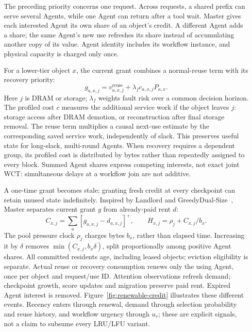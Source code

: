 The preceding priority concerns one request. Across requests, a shared
prefix can serve several Agents, while one Agent can return after a tool
wait. Master gives each interested Agent its own share of an object's
credit. A different Agent adds a share; the same Agent's new use refreshes
its share instead of accumulating another copy of its value. Agent
identity includes its workflow instance, and physical capacity is charged
only once.

For a lower-tier object $x$, the current grant combines a normal-reuse
term with its recovery priority:
\begin{equation}
 g_{a,x,j}=v^{\mathrm{reuse}}_{a,x,j}
                +\lambda_f c_{a,x,j}P_{a,x}.
 \label{eq:credit-grant}
\end{equation}
Here $j$ is DRAM or storage; $\lambda_f$ weights fault risk over a common
decision horizon. The profiled cost $c$ measures the additional service
work if the object leaves $j$: storage access after DRAM demotion, or
reconstruction after final storage removal. The reuse term multiplies a causal next-use estimate by the corresponding
saved service work, independently
of slack. This preserves useful state for long-slack, multi-round Agents.
When recovery requires a dependent group, its profiled cost is distributed
by bytes rather than repeatedly assigned to every block. Summed Agent
shares express competing interests, not exact joint WCT: simultaneous
delays at a workflow join are not additive.

A one-time grant becomes stale; granting fresh credit at every checkpoint
can retain unused state indefinitely. Inspired by Landlord and
GreedyDual-Size~\cite{young2002landlord,cao1997greedydual}, Master separates
current grant $g$ from already-paid rent $d$:
\begin{equation}
 C_{x,j}=\sum_a[g_{a,x,j}-d_{a,x,j}]^+,
 \qquad H_{x,j}=\rho_j+C_{x,j}/b_x.
 \label{eq:rental-credit}
\end{equation}
The pool pressure clock $\rho_j$ charges bytes $b_x$, rather than elapsed
time. Increasing it by $\delta$ removes $\min(C_{x,j},b_x\delta)$, split
proportionally among positive Agent shares. All committed residents age,
including leased objects; eviction eligibility is separate. Actual reuse or recovery consumption renews only the using Agent,
once per object and request/use ID. Attention observations refresh demand;
checkpoint growth, score updates and migration preserve paid rent.
Expired Agent interest is removed. Figure~\ref{fig:renewable-credit}
illustrates these different events. Recency enters through renewal,
demand through selection probability and reuse history, and workflow
urgency through $u_r$; these are explicit signals, not a claim to subsume
every LRU/LFU variant.

